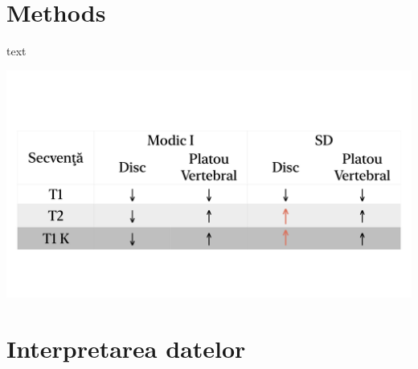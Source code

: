 \message{ !name(LaMain.tex)}\documentclass[romanian,12pt,a4paper]{article}
\begin{document}
\section{Methods}
text
\begin{table}
	\includegraphics[width=\textwidth]{Files/tb-DSI_vs_MODIC.png}

\end{table}

\pagebreak
\section{Interpretarea datelor}
\pagebreak
\printbibliography[title={Bibliografie}]
\end{document}
